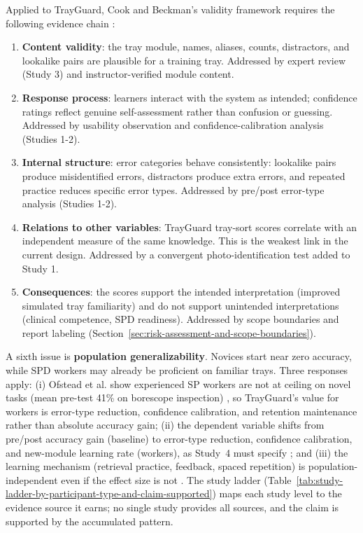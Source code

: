 \documentclass[10pt,a4paper]{article}
\begin{document}
Applied to TrayGuard, Cook and Beckman's validity framework requires the
following evidence chain \cite{cook-beckman-validity-2006}:
\begin{enumerate}
  \item \textbf{Content validity}: the tray module, names, aliases, counts,
  distractors, and lookalike pairs are plausible for a training tray. Addressed
  by expert review (Study 3) and instructor-verified module content.
  \item \textbf{Response process}: learners interact with the system as intended;
  confidence ratings reflect genuine self-assessment
  rather than confusion or guessing. Addressed by usability observation and
  confidence-calibration analysis (Studies 1-2).
  \item \textbf{Internal structure}: error categories behave consistently: lookalike
  pairs produce misidentified errors, distractors produce extra errors, and
  repeated practice reduces specific error types. Addressed by pre/post error-type
  analysis (Studies 1-2).
  \item \textbf{Relations to other variables}: TrayGuard tray-sort scores correlate
  with an independent measure of the same knowledge. This is the weakest link
  in the current design. Addressed by a convergent photo-identification test
  added to Study 1.
  \item \textbf{Consequences}: the scores support the intended interpretation
  (improved simulated tray familiarity) and do not support unintended
  interpretations (clinical competence, SPD readiness). Addressed by scope
  boundaries and report labeling (Section~\ref{sec:risk-assessment-and-scope-boundaries}).
\end{enumerate}

A sixth issue is \textbf{population generalizability}. Novices start near zero
accuracy, while SPD workers may already be proficient on familiar trays.
Three responses apply: (i) Ofstead et al. show experienced SP workers are not
at ceiling on novel tasks (mean pre-test 41\% on borescope inspection)
\cite{ofstead-et-al-2023}, so TrayGuard's value for workers is error-type
reduction, confidence calibration, and retention maintenance rather than
absolute accuracy gain; (ii) the dependent variable shifts from pre/post
accuracy gain (baseline) to error-type reduction, confidence calibration, and
new-module learning rate (workers), as Study~4 must specify
\cite{kirkpatrick-evaluation-1994}; and (iii) the learning mechanism (retrieval
practice, feedback, spaced repetition) is population-independent even if the
effect size is not \cite{arthur-et-al-2003, roediger-and-karpicke-2006,
dunlosky-et-al-2013, larsen-et-al-2009}. The study ladder
(Table~\ref{tab:study-ladder-by-participant-type-and-claim-supported}) maps
each study level to the evidence source it earns; no single study provides all
sources, and the claim is supported by the accumulated pattern.
\end{document}
